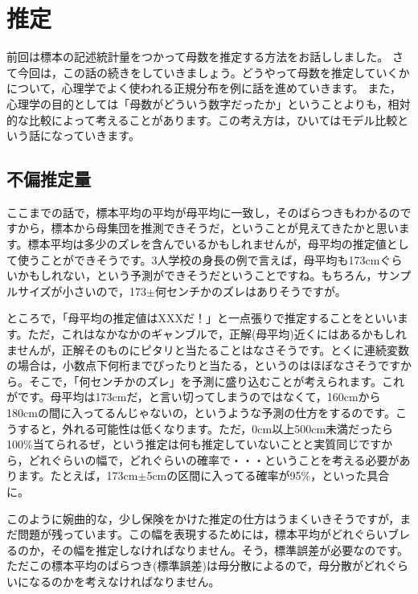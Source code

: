 \documentclass{ltjsbook}
\begin{document}
\chapter{推定}
\label{ch12_test}
前回は標本の記述統計量をつかって母数を推定する方法をお話ししました。
さて今回は，この話の続きをしていきましょう。どうやって母数を推定していくかについて，心理学でよく使われる正規分布を例に話を進めていきます。
また，心理学の目的としては「母数がどういう数字だったか」ということよりも，相対的な比較によって考えることがあります。この考え方は，ひいてはモデル比較という話になっていきます。

\section{不偏推定量}
ここまでの話で，標本平均の平均が母平均に一致し，そのばらつきもわかるのですから，標本から母集団を推測できそうだ，ということが見えてきたかと思います。標本平均は多少のズレを含んでいるかもしれませんが，母平均の推定値として使うことができそうです。3人学校の身長の例で言えば，母平均も173cmぐらいかもしれない，という予測ができそうだということですね。もちろん，サンプルサイズが小さいので，173$\pm$何センチかのズレはありそうですが。

ところで，「母平均の推定値はXXXだ！」と一点張りで推定することをといいます。ただ，これはなかなかのギャンブルで，正解(母平均)近くにはあるかもしれませんが，正解そのものにピタリと当たることはなさそうです。とくに連続変数の場合は，小数点下何桁までぴったりと当たる，というのはほぼなさそうですから。そこで，「何センチかのズレ」を予測に盛り込むことが考えられます。これがです。母平均は173cmだ，と言い切ってしまうのではなくて，160cmから180cmの間に入ってるんじゃないの，というような予測の仕方をするのです。こうすると，外れる可能性は低くなります。ただ，0cm以上500cm未満だったら100\%当てられるぜ，という推定は何も推定していないことと実質同じですから，どれぐらいの幅で，どれぐらいの確率で・・・ということを考える必要があります。たとえば，173cm$\pm$5cmの区間に入ってる確率が95\%，といった具合に。

このように婉曲的な，少し保険をかけた推定の仕方はうまくいきそうですが，まだ問題が残っています。この幅を表現するためには，標本平均がどれぐらいブレるのか，その幅を推定しなければなりません。そう，標準誤差が必要なのです。ただこの標本平均のばらつき(標準誤差)は母分散によるので，母分散がどれぐらいになるのかを考えなければなりません。
\end{document}
